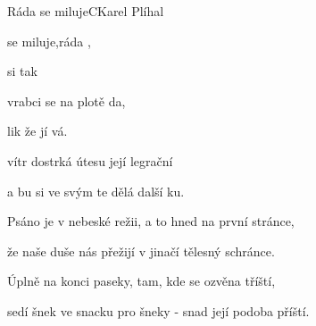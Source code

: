 \begin{song}{Ráda se miluje}{C}{Karel Plíhal}

\begin{SBChorus}

 se miluje,ráda ,

 si  tak

vrabci se na plotě da,

lik že  jí vá.

\end{SBChorus}

\begin{SBVerse}

 vítr dostrká  útesu  její legrační 

a bu si ve svým te dělá  další ku.

\end{SBVerse}

\begin{SBChorus}

\end{SBChorus}

\begin{SBVerse}

Psáno je v nebeské režii, a to hned na první stránce,

že naše duše nás přežijí v jinačí tělesný schránce.

\end{SBVerse}

\begin{SBChorus}

\end{SBChorus}

\begin{SBVerse}

Úplně na konci paseky, tam, kde se ozvěna tříští,

sedí šnek ve snacku pro šneky - snad její podoba příští.

\end{SBVerse}

\begin{SBChorus}

\end{SBChorus}

\end{song}

\clearpage

